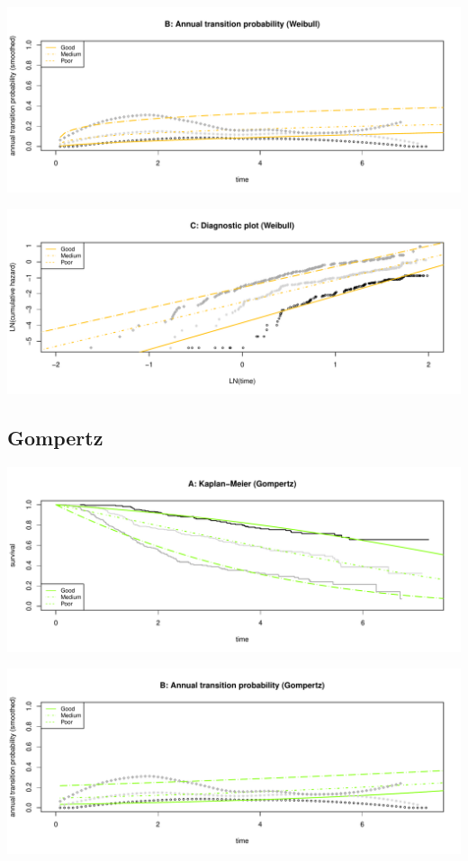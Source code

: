 \documentclass[]{article}
\begin{document}
\begin{flushleft}\includegraphics[height=0.3\textheight]{images/weib-2} \end{flushleft}

\begin{flushleft}\includegraphics[height=0.3\textheight]{images/weib-3} \end{flushleft}

\subsection{Gompertz}\label{gompertz}

\begin{flushleft}\includegraphics[height=0.3\textheight]{images/gom-1} \end{flushleft}

\begin{flushleft}\includegraphics[height=0.3\textheight]{images/gom-2} \end{flushleft}
\end{document}
